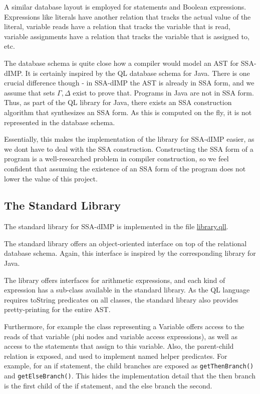 A similar database layout is employed for statements and Boolean expressions.
Expressions like literals have another relation that tracks the actual value of the
literal, variable reads have a relation that tracks the variable that is read,
variable assignments have a relation that tracks the variable that is assigned to, etc.

The database schema is quite close how a compiler would model an AST for SSA-dIMP.
It is certainly inspired by the QL database schema for Java.
There is one crucial difference though - in SSA-dIMP the AST is already in SSA form,
and we assume that sets $\Gamma, \Delta$ exist to prove that.
Programs in Java are not in SSA form.
Thus, as part of the QL library for Java, there exists an SSA construction algorithm
that synthesizes an SSA form.
As this is computed on the fly, it is not represented in the database schema.

Essentially, this makes the implementation of the library for SSA-dIMP easier,
as we dont have to deal with the SSA construction.
Constructing the SSA form of a program is a well-researched problem in compiler
construction, so we feel confident that assuming the existence of an SSA form 
of the program does not lower the value of this project.

\subsection{The Standard Library}
The standard library for SSA-dIMP is implemented in the file \hyperref[lst:library]{library.qll}.

The standard library offers an object-oriented interface on top of the relational
database schema.
Again, this interface is inspired by the corresponding library for Java.

The library offers interfaces for arithmetic expressions, and each kind of expression
has a sub-class available in the standard library.
As the QL language requires toString predicates on all classes,
the standard library also provides pretty-printing for the entire AST.

Furthermore, for example the class representing a Variable offers access to the
reads of that variable (phi nodes and variable access expressions), as well
as access to the statements that assign to this variable.
Also, the parent-child relation is exposed, and used to implement named helper predicates.
For example, for an if statement, the child branches are exposed as \texttt{getThenBranch()}
and \texttt{getElseBranch()}.
This hides the implementation detail that the then branch is the first child of the
if statement, and the else branch the second.

